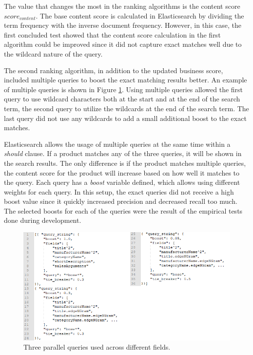 The value that changes the most in the ranking algorithms is the content score $score_{content}$.
The base content score is calculated in Elasticsearch by dividing the term frequency with the
inverse document frequency.
However, in this case, the first concluded test showed that the content score calculation in the first algorithm
could be improved since it did not capture exact matches well due to the wildcard nature of the query.

The second ranking algorithm, in addition to the updated business score, 
included multiple queries to boost the exact matching results better. 
An example of multiple queries is shown in Figure \ref{fig:new-query}.
Using multiple queries allowed the first query to use wildcard characters both at the start and at the end of 
the search term, the second query to utilize the wildcards at the end of the search term.
The last query did not use any wildcards to add a small additional boost to the exact matches.


Elasticsearch allows the usage of multiple queries at the same time within a \emph{should} clause.
If a product matches any of the three queries, it will be shown in the search results.
The only difference is if the product matches multiple queries, the content score
for the product will increase based on how well it matches to the query.
Each query has a \emph{boost} variable defined, which allows using different weights
for each query. 
In this setup, the exact queries did not receive a high boost value since it quickly increased
precision and decreased recall too much.
The selected boosts for each of the queries were the result of the empirical tests done during
development.


\begin{figure}
    \centering
    \includegraphics[width=\textwidth]{img/new-query-v.png}
    \caption{Three parallel queries used across different fields.}
    \label{fig:new-query}
\end{figure}


